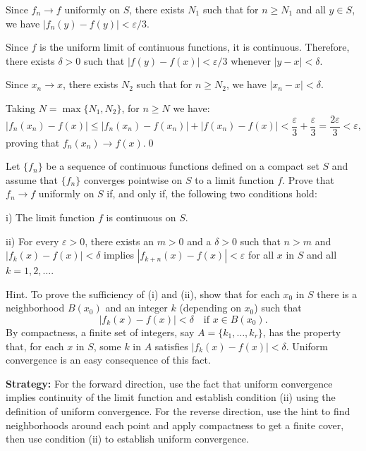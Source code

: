 Since \( f_n \to f \) uniformly on \( S \), there exists \( N_1 \) such that for \( n \geq N_1 \) and all \( y \in S \), we have \( |f_n(y) - f(y)| < \varepsilon/3 \).

Since \( f \) is the uniform limit of continuous functions, it is continuous. Therefore, there exists \( \delta > 0 \) such that \( |f(y) - f(x)| < \varepsilon/3 \) whenever \( |y - x| < \delta \).

Since \( x_n \to x \), there exists \( N_2 \) such that for \( n \geq N_2 \), we have \( |x_n - x| < \delta \).

Taking \( N = \max\{N_1, N_2\} \), for \( n \geq N \) we have:
\[|f_n(x_n) - f(x)| \leq |f_n(x_n) - f(x_n)| + |f(x_n) - f(x)| < \frac{\varepsilon}{3} + \frac{\varepsilon}{3} = \frac{2\varepsilon}{3} < \varepsilon,\]
proving that \( f_n(x_n) \to f(x) \).\qed


\begin{problembox}
Let \( \{f_n\} \) be a sequence of continuous functions defined on a compact set \( S \) and assume that \( \{f_n\} \) converges pointwise on \( S \) to a limit function \( f \). Prove that \( f_n \to f \) uniformly on \( S \) if, and only if, the following two conditions hold:

i) The limit function \( f \) is continuous on \( S \).

ii) For every \( \varepsilon > 0 \), there exists an \( m > 0 \) and a \( \delta > 0 \) such that \( n > m \) and \( |f_k(x) - f(x)| < \delta \) implies \( |f_{k+n}(x) - f(x)| < \varepsilon \) for all \( x \) in \( S \) and all \( k = 1, 2, \ldots \).

Hint. To prove the sufficiency of (i) and (ii), show that for each \( x_0 \) in \( S \) there is a neighborhood \( B(x_0) \) and an integer \( k \) (depending on \( x_0 \)) such that
\[|f_k(x) - f(x)| < \delta \quad \text{if } x \in B(x_0).\]
By compactness, a finite set of integers, say \( A = \{k_1, \ldots, k_r\} \), has the property that, for each \( x \) in \( S \), some \( k \) in \( A \) satisfies \( |f_k(x) - f(x)| < \delta \). Uniform convergence is an easy consequence of this fact.
\end{problembox}

\noindent\textbf{Strategy:} For the forward direction, use the fact that uniform convergence implies continuity of the limit function and establish condition (ii) using the definition of uniform convergence. For the reverse direction, use the hint to find neighborhoods around each point and apply compactness to get a finite cover, then use condition (ii) to establish uniform convergence.

